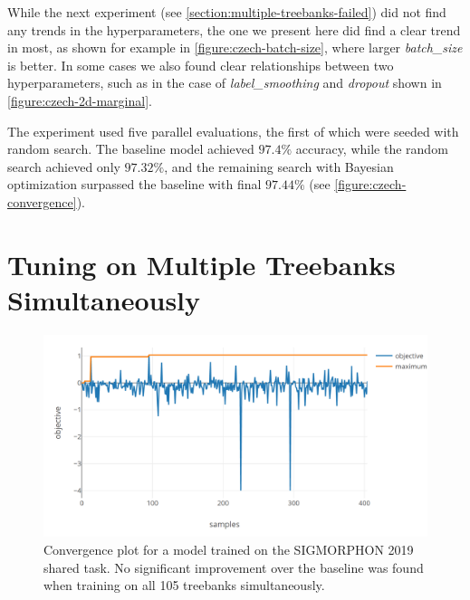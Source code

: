 While the next experiment (see \autoref{section:multiple-treebanks-failed}) did not find any trends in the hyperparameters, the one we present here did find a clear trend in most, as shown for example in \autoref{figure:czech-batch-size}, where larger \emph{batch\_size} is better. In some cases we also found clear relationships between two hyperparameters, such as in the case of \emph{label\_smoothing} and \emph{dropout} shown in \autoref{figure:czech-2d-marginal}.

The experiment used five parallel evaluations, the first of which were seeded with random search. The baseline model achieved $97.4\%$ accuracy, while the random search achieved only $97.32\%$, and the remaining search with Bayesian optimization surpassed the baseline with final $97.44\%$ (see \autoref{figure:czech-convergence}).


\section{Tuning on Multiple Treebanks Simultaneously}
\label{section:multiple-treebanks-failed}

\begin{figure}[t]
	\begin{center}
		\includegraphics[width=1.0\textwidth]{images/sig-convergence.png}
		\caption{Convergence plot for a model trained on the SIGMORPHON 2019 shared task. No significant improvement over the baseline was found when training on all 105 treebanks simultaneously.}
		\label{figure:sigmorphon-convergence}
	\end{center}
\end{figure}

